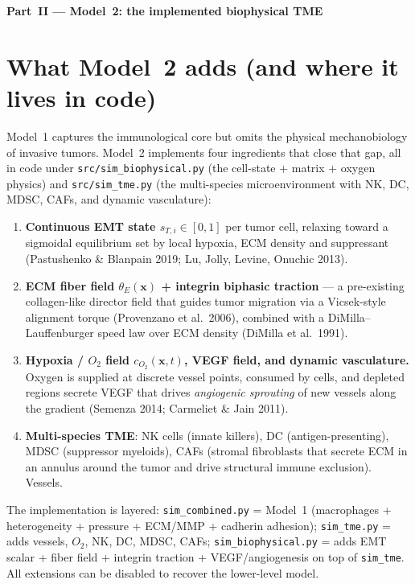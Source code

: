 \documentclass[11pt,letterpaper]{article}
\begin{document}
\begin{center}
{\bfseries Part~II --- Model~2: the implemented biophysical TME}
\end{center}

\section{What Model~2 adds (and where it lives in code)}
\label{sec:m2}

Model~1 captures the immunological core but omits the physical
mechanobiology of invasive tumors. Model~2 implements four ingredients
that close that gap, all in code under
\texttt{src/sim\_biophysical.py} (the cell-state + matrix + oxygen
physics) and \texttt{src/sim\_tme.py} (the multi-species microenvironment
with NK, DC, MDSC, CAFs, and dynamic vasculature):

\begin{enumerate}[nosep, leftmargin=*]
  \item \textbf{Continuous EMT state $s_{T,i} \in [0,1]$} per tumor cell,
        relaxing toward a sigmoidal equilibrium set by local hypoxia,
        ECM density and suppressant (Pastushenko \& Blanpain 2019;
        Lu, Jolly, Levine, Onuchic 2013).
  \item \textbf{ECM fiber field $\theta_E(\mathbf{x})$ + integrin biphasic
        traction} --- a pre-existing collagen-like director field that
        guides tumor migration via a Vicsek-style alignment torque
        (Provenzano et al.\ 2006), combined with a DiMilla--Lauffenburger
        speed law over ECM density (DiMilla et al.\ 1991).
  \item \textbf{Hypoxia / $O_2$ field $c_{O_2}(\mathbf{x},t)$, VEGF
        field, and dynamic vasculature.} Oxygen is supplied at
        discrete vessel points, consumed by cells, and depleted regions
        secrete VEGF that drives \emph{angiogenic sprouting} of new
        vessels along the gradient (Semenza 2014; Carmeliet \& Jain 2011).
  \item \textbf{Multi-species TME}: NK cells (innate killers), DC
        (antigen-presenting), MDSC (suppressor myeloids), CAFs
        (stromal fibroblasts that secrete ECM in an annulus around the
        tumor and drive structural immune exclusion). Vessels.
\end{enumerate}

\noindent
The implementation is layered: \texttt{sim\_combined.py} = Model~1
(macrophages + heterogeneity + pressure + ECM/MMP + cadherin adhesion);
\texttt{sim\_tme.py} = adds vessels, $O_2$, NK, DC, MDSC, CAFs;
\texttt{sim\_biophysical.py} = adds EMT scalar + fiber field + integrin
traction + VEGF/angiogenesis on top of \texttt{sim\_tme}. All extensions
can be disabled to recover the lower-level model.
\end{document}
